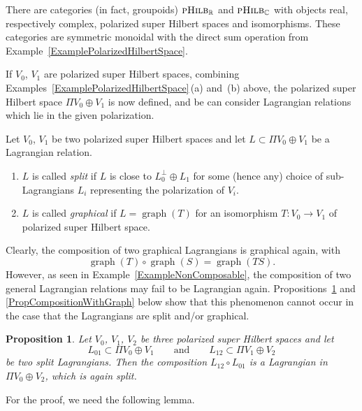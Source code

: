 \documentclass[pdftex]{sigma}
\numberwithin{equation}{section}
\newtheorem{Proposition}[Theorem]{Proposition}
 { \theoremstyle{definition}
\newtheorem{Definition}[Theorem]{Definition}
\newtheorem{Note}[Theorem]{Note}
\newtheorem{Example}[Theorem]{Example}
\newtheorem{Construction}[Theorem]{Construction}
\newtheorem{Observation}[Theorem]{Observation}
\newtheorem{Remark}[Theorem]{Remark} }
\DeclareMathOperator{\graph}{\mathrm{graph}}
\newcommand{\pHilb}{\textsc{pHilb}}
\newcommand{\R}{\mathbb{R}}
\newcommand{\C}{\mathbb{C}}
\begin{document}
There are categories (in fact, groupoids) $\pHilb_{\R}$ and $\pHilb_{\C}$ with objects real, respectively complex, polarized super Hilbert spaces and isomorphisms.
These categories are symmetric monoidal with the direct sum operation from Example~\ref{ExamplePolarizedHilbertSpace}.

If $V_0$, $V_1$ are polarized super Hilbert spaces, combining Examples~\ref{ExamplePolarizedHilbertSpace}\,(a) and~(b) above, the polarized super Hilbert space $\Pi V_0 \oplus V_1$ is now defined, and be can consider Lagrangian relations which lie in the given polarization.

\begin{Definition}
Let $V_0$, $V_1$ be two polarized super Hilbert spaces and let $L \subset \Pi V_0 \oplus V_1$ be a Lagrangian relation.
\begin{enumerate}\itemsep=0pt
\item[(a)]
$L$ is called \emph{split} if $L$ is close to $L_0^\perp \oplus L_1$ for some (hence any) choice of sub-Lagrangians $L_i$ representing the polarization of $V_i$.
\item[(b)]
$L$ is called \emph{graphical} if $L = \graph(T)$ for an isomorphism $T\colon V_0 \to V_1$ of polarized super Hilbert space.
\end{enumerate}
\end{Definition}

Clearly, the composition of two graphical Lagrangians is graphical again, with
\[
\graph(T) \circ \graph(S) = \graph(TS).
\]
However, as seen in Example~\ref{ExampleNonComposable}, the composition of two general Lagrangian relations may fail to be Lagrangian again.
Propositions~\ref{PropCompositionOfSplit} and \ref{PropCompositionWithGraph} below show that this phenomenon cannot occur in the case that the Lagrangians are split and/or graphical.

\begin{Proposition}\label{PropCompositionOfSplit}
 Let $V_0$, $V_1$, $V_2$ be three polarized super Hilbert spaces and let
 \begin{equation*}
 L_{01} \subset \Pi V_0 \oplus V_1 \qquad \text{and} \qquad L_{12} \subset \Pi V_1 \oplus V_2
 \end{equation*}
 be two split Lagrangians.
 Then the composition $L_{12} \circ L_{01}$ is a Lagrangian in $\Pi V_0 \oplus V_2$, which is again split.
\end{Proposition}

For the proof, we need the following lemma.
\end{document}
